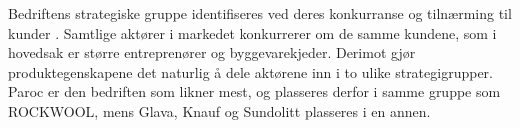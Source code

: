\indent \newline
\indent \newline
\begin{table}[ht]
\centering
{}
\caption{Produktegenskaper}
\label{produktegenskaper}
\end{table}
\indent \newline
Bedriftens strategiske gruppe identifiseres ved deres konkurranse og tilnærming til kunder \cite[s.~88]{FjeldstadogLunnan2018}. Samtlige aktører i markedet konkurrerer om de samme kundene, som i hovedsak er større entreprenører og byggevarekjeder. Derimot gjør produktegenskapene det naturlig å dele aktørene inn i to ulike strategigrupper. Paroc er den bedriften som likner mest, og plasseres derfor i samme gruppe som ROCKWOOL, mens Glava, Knauf og Sundolitt plasseres i en annen.
 
